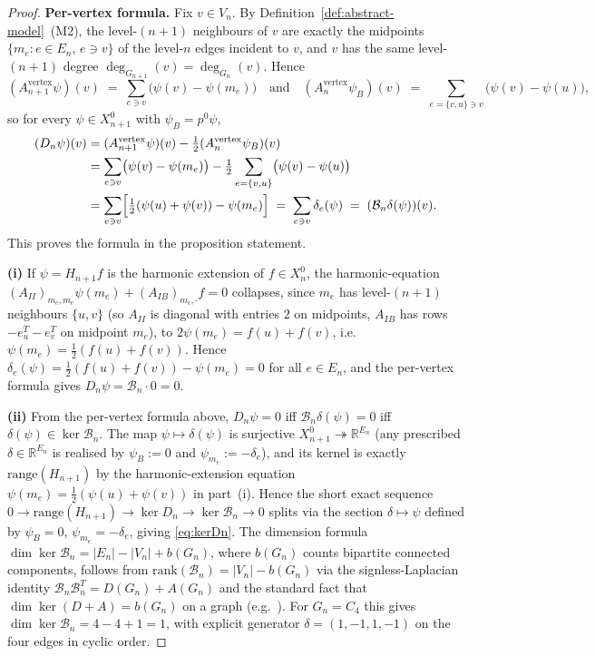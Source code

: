 \documentclass[11pt]{article}
\theoremstyle{plain}
\theoremstyle{definition}
\theoremstyle{remark}
\newcommand{\R}{\mathbb{R}}
\begin{document}
\begin{proof}
\textbf{Per-vertex formula.} Fix $v \in V_n$. By
Definition~\ref{def:abstract-model}~\textup{(M2)}, the level-$(n+1)$
neighbours of $v$ are exactly the midpoints
$\{m_e : e \in E_n,\, e \ni v\}$ of the level-$n$ edges incident to
$v$, and $v$ has the same level-$(n+1)$ degree
$\deg_{G_{n+1}}(v) = \deg_{G_n}(v)$. Hence
\[
   (A_{n+1}^{\mathrm{vertex}} \psi)(v)
   \;=\; \sum_{e \ni v} \bigl(\psi(v) - \psi(m_e)\bigr)
   \quad\text{and}\quad
   (A_n^{\mathrm{vertex}} \psi_B)(v)
   \;=\; \sum_{e = \{v, u\} \ni v} \bigl(\psi(v) - \psi(u)\bigr),
\]
so for every $\psi \in X_{n+1}^{0}$ with $\psi_B = p^{0} \psi$,
\begin{align*}
   (D_n \psi)(v)
   &= (A_{n+1}^{\mathrm{vertex}} \psi)(v)
      - \tfrac12 (A_n^{\mathrm{vertex}} \psi_B)(v) \\
   &= \sum_{e \ni v} \bigl(\psi(v) - \psi(m_e)\bigr)
      - \tfrac12 \sum_{e = \{v, u\}} \bigl(\psi(v) - \psi(u)\bigr) \\
   &= \sum_{e \ni v} \Bigl[\tfrac12(\psi(u) + \psi(v)) - \psi(m_e)\Bigr]
   \;=\; \sum_{e \ni v} \delta_e(\psi)
   \;=\; (\mathcal{B}_n \delta(\psi))(v).
\end{align*}
This proves the formula in the proposition statement.

\smallskip
\textbf{(i)} If $\psi = H_{n+1} f$ is the harmonic extension of
$f \in X_n^{0}$, the harmonic-equation
$(A_{II})_{m_e, m_e} \psi(m_e) + (A_{IB})_{m_e, \cdot} f = 0$
collapses, since $m_e$ has level-$(n+1)$ neighbours
$\{u, v\}$ (so $A_{II}$ is diagonal with entries $2$ on midpoints,
$A_{IB}$ has rows $-e_u^{T} - e_v^{T}$ on midpoint $m_e$), to
$2 \psi(m_e) = f(u) + f(v)$, i.e.\
$\psi(m_e) = \tfrac12(f(u) + f(v))$. Hence
$\delta_e(\psi) = \tfrac12(f(u) + f(v)) - \psi(m_e) = 0$ for all
$e \in E_n$, and the per-vertex formula gives
$D_n \psi = \mathcal{B}_n \cdot 0 = 0$.

\smallskip
\textbf{(ii)} From the per-vertex formula above, $D_n \psi = 0$ iff
$\mathcal{B}_n \delta(\psi) = 0$ iff $\delta(\psi) \in \ker \mathcal{B}_n$. The map
$\psi \mapsto \delta(\psi)$ is surjective
$X_{n+1}^{0} \twoheadrightarrow \R^{E_n}$ (any prescribed
$\delta \in \R^{E_n}$ is realised by $\psi_B := 0$ and
$\psi_{m_e} := -\delta_e$), and its kernel is exactly
$\mathrm{range}(H_{n+1})$ by the harmonic-extension equation
$\psi(m_e) = \tfrac12(\psi(u) + \psi(v))$ in part~(i). Hence the
short exact sequence
$0 \to \mathrm{range}(H_{n+1}) \to \ker D_n \to \ker \mathcal{B}_n \to 0$
splits via the section $\delta \mapsto \psi$ defined by $\psi_B = 0$,
$\psi_{m_e} = -\delta_e$, giving \eqref{eq:kerDn}. The dimension
formula $\dim \ker \mathcal{B}_n = |E_n| - |V_n| + b(G_n)$, where $b(G_n)$
counts bipartite connected components, follows from
$\mathrm{rank}(\mathcal{B}_n) = |V_n| - b(G_n)$ via the signless-Laplacian
identity $\mathcal{B}_n \mathcal{B}_n^{T} = D(G_n) + A(G_n)$ and the standard fact that
$\dim \ker (D + A) = b(G_n)$ on a graph (e.g.\
\cite[Prop.~1.3.10]{BrouwerHaemers}). For $G_n = C_4$ this gives
$\dim \ker \mathcal{B}_n = 4 - 4 + 1 = 1$, with explicit generator
$\delta = (1, -1, 1, -1)$ on the four edges in cyclic order.


\end{proof}
\end{document}
